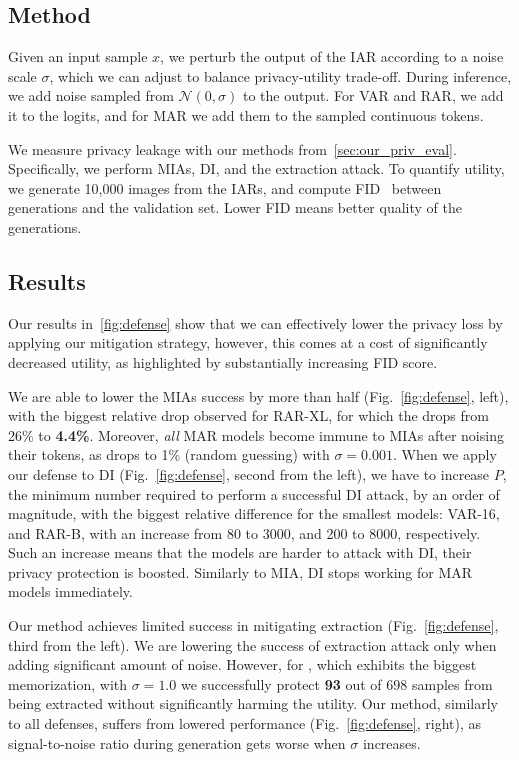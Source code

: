 \subsection{Method}
Given an input sample $x$, we perturb the output of the IAR according to a noise scale $\sigma$, which we can adjust to balance privacy-utility trade-off. During inference, we add noise sampled from $\mathcal{N}(0,\sigma)$ to the output. For VAR and RAR, we add it to the logits, and for MAR we add them to the sampled continuous tokens.

We measure privacy leakage with our methods from~\cref{sec:our_priv_eval}. Specifically, we perform MIAs, DI, and the extraction attack. To quantify utility, we generate 10,000 images from the IARs, and compute FID~\citep{heusel2017gans} between generations and the validation set. Lower FID means better quality of the generations.

\subsection{Results}

Our results in~\cref{fig:defense} show that we can effectively lower the privacy loss by applying our mitigation strategy, however, this comes at a cost of significantly decreased utility, as highlighted by substantially increasing FID score. 

We are able to lower the MIAs success by more than half (Fig.~\ref{fig:defense}, left), with the biggest relative drop observed for RAR-XL, for which the \tprat drops from 26\% to \textbf{4.4\%}. Moreover, \textit{all} MAR models become immune to MIAs after noising their tokens, as \tprat drops to 1\% (random guessing) with $\sigma=0.001$. 
When we apply our defense to DI (Fig.~\ref{fig:defense}, second from the left), we have to increase $P$, the minimum number required to perform a successful DI attack, by an order of magnitude, with the biggest relative difference for the smallest models: VAR-16, and RAR-B, with an increase from 80 to 3000, and 200 to 8000, respectively. Such an increase means that the models are harder to attack with DI, \ie their privacy protection is boosted. Similarly to MIA, DI stops working for MAR models immediately.

Our method achieves limited success in mitigating extraction (Fig.~\ref{fig:defense}, third from the left). We are lowering the success of extraction attack only when adding significant amount of noise. However, for \varbig, which exhibits the biggest memorization, with $\sigma=1.0$ we successfully protect \textbf{93} out of 698 samples from being extracted without significantly harming the utility.
Our method, similarly to all defenses, suffers from lowered performance (Fig.~\ref{fig:defense}, right), as signal-to-noise ratio during generation gets worse when $\sigma$ increases.

